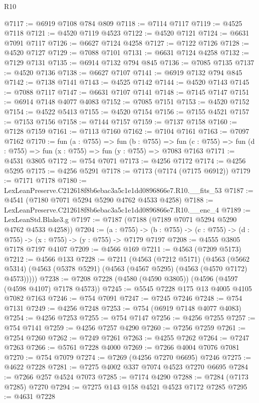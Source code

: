 \begin{lexlean}{R10}
\begin{coremodule}
@7117 := @6919 @7108 @784 @809
@7118 := @7114 @7117
@7119 := @4525 @7118
@7121 := @4520 @7119 @4523
@7122 := @4520 @7121
@7124 := @6631 @7091 @7117
@7126 := @6627 @7124 @4258
@7127 := @7122 @7126
@7128 := @4520 @7127
@7129 := @7088 @7101
@7131 := @6631 @7124 @4258
@7132 := @7129 @7131
@7135 := @6914 @7132 @794 @845
@7136 := @7085 @7135
@7137 := @4520 @7136
@7138 := @6627 @7107
@7141 := @6919 @7132 @794 @845
@7142 := @7138 @7141
@7143 := @4525 @7142
@7144 := @4520 @7143
@7145 := @7088 @7117
@7147 := @6631 @7107 @7141
@7148 := @7145 @7147
@7151 := @6914 @7148 @4077 @4083
@7152 := @7085 @7151
@7153 := @4520 @7152
@7154 := @4522 @5413
@7155 := @4520 @7154
@7156 := @7155 @4521
@7157 := @7153 @7156
@7158 := @7144 @7157
@7159 := @7137 @7158
@7160 := @7128 @7159
@7161 := @7113 @7160
@7162 := @7104 @7161
@7163 := @7097 @7162
@7170 := fun (a : @755) =>
  fun (b : @755) =>
  fun (c : @755) => fun (d : @755) => fun (x : @755) => fun (y : @755) => @7083 @7163
@7171 := @4531 @3805
@7172 := @754 @7071
@7173 := @4256 @7172
@7174 := @4256 @5295
@7175 := @4256 @5291
@7178 := @7173 (@7174 (@7175 @6912))
@7179 := @7171 @7178
@7180 := LexLeanPreserve.C212618f8b6ebac3a5c1e1dd0896866e7.R10.__fits_53
@7187 := @4541 (@7180 @7071 @5294 @5290 @4762 @4533 @4258)
@7188 := LexLeanPreserve.C212618f8b6ebac3a5c1e1dd0896866e7.R10.__enc_4
@7189 := LexLeanStd.Blake3.g
@7197 := @7187 (@7188 (@7189 @7071 @5294 @5290 @4762 @4533 @4258))
@7204 := (a : @755) ->
  (b : @755) -> (c : @755) -> (d : @755) -> (x : @755) -> (y : @755) -> @7179 @7197
@7208 := @4555 @3805 @7178 @7197 @4107
@7209 := @4566 @169
@7211 := @4563 (@7209 @5173)
@7212 := @4566 @133
@7228 := @7211
    (@4563
      (@7212 @5171)
      (@4563 (@5662 @5314) (@4563 (@5378 @5291) (@4563 (@4567 @5295) (@4563 (@4570 @7172) @4573)))))
@7238 := @7208 @7228 (@4580 (@4590 @3805)) (@4596 (@4597 (@4598 @4107) @7178 @4573))
@7245 := @5545 @7228 @175 @13 @4005 @4105 @7082 @7163
@7246 := @754 @7091
@7247 := @7245 @7246
@7248 := @754 @7131
@7249 := @4256 @7248
@7253 := @754 (@6919 @7148 @4077 @4083)
@7254 := @4256 @7253
@7255 := @754 @7147
@7256 := @4256 @7255
@7257 := @754 @7141
@7259 := @4256 @7257 @4290
@7260 := @7256 @7259
@7261 := @7254 @7260
@7262 := @7249 @7261
@7263 := @4255 @7262
@7264 := @7247 @7263
@7266 := @5761 @7228 @4000
@7269 := @7266 @4004 @7076 @7081
@7270 := @754 @7079
@7274 := @7269 (@4256 @7270 @6695) @7246
@7275 := @4622 @7228
@7281 := @7275 @4002 @337 @7074 @4523 @7270 @6695
@7284 := @7266 @257 @4524 @7073
@7285 := @7174 @4290
@7288 := @7284 (@7173 @7285) @7270
@7294 := @7275 @143 @158 @4521 @4523 @7172 @7285
@7295 := @4631 @7228

\end{coremodule}
\end{lexlean}
